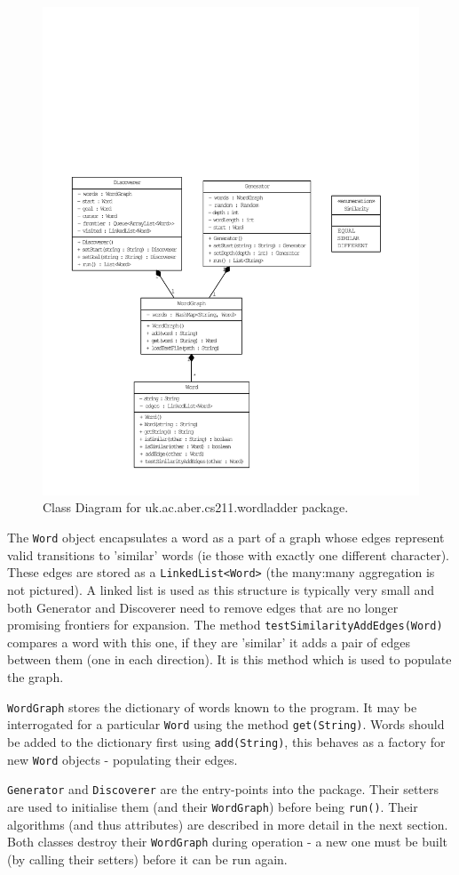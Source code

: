 \documentclass[11pt]{article} %
\begin{document}
\begin{figure}[h!]
\includegraphics[width=\textwidth]{ClassDiagram}
\caption{Class Diagram for uk.ac.aber.cs211.wordladder package.}
\end{figure}

The \texttt{Word} object encapsulates a word as a part of a graph whose edges represent valid transitions to 'similar' words (ie those with exactly one different character). These edges are stored as a \texttt{LinkedList<Word>} (the many:many aggregation is not pictured). A linked list is used as this structure is typically very small and both Generator and Discoverer need to remove edges that are no longer promising frontiers for expansion. The method \texttt{testSimilarityAddEdges(Word)} compares a word with this one, if they are 'similar' it adds a pair of edges between them (one in each direction). It is this method which is used to populate the graph.

\texttt{WordGraph} stores the dictionary of words known to the program. It may be interrogated for a particular \texttt{Word} using the method \texttt{get(String)}. Words should be added to the dictionary first using \texttt{add(String)}, this behaves as a factory for new \texttt{Word} objects - populating their edges.

\texttt{Generator} and \texttt{Discoverer} are the entry-points into the package. Their setters are used to initialise them (and their \texttt{WordGraph}) before being \texttt{run()}. Their algorithms (and thus attributes) are described in more detail in the next section. Both classes destroy their \texttt{WordGraph} during operation - a new one must be built (by calling their setters) before it can be run again.
\end{document}
